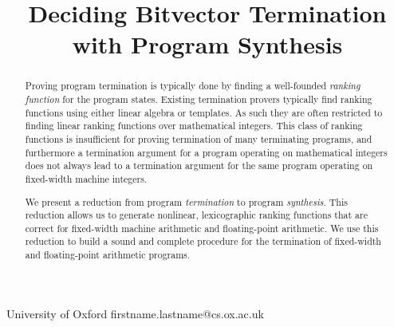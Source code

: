\documentclass[preprint]{sigplanconf}
\theoremstyle{definition}
\begin{document}
\setlength{\pdfpageheight}{\paperheight}
\setlength{\pdfpagewidth}{\paperwidth}





\title{Deciding Bitvector Termination with Program Synthesis}

           {University of Oxford}
           {firstname.lastname@cs.ox.ac.uk}

\maketitle

\begin{abstract}
%
Proving program termination is typically done by finding a well-founded
\emph{ranking function} for the program states.  Existing termination
provers typically find ranking functions using either linear algebra or
templates.  As such they are often restricted to finding linear ranking
functions over mathematical integers.  This class of ranking functions is
insufficient for proving termination of many terminating programs, and
furthermore a termination argument for a program operating on mathematical
integers does not always lead to a termination argument for the same program
operating on fixed-width machine integers.

We present a reduction from program \emph{termination} to program
\emph{synthesis}.  This reduction allows us to generate nonlinear,
lexicographic ranking functions that are correct for fixed-width machine
arithmetic and floating-point arithmetic.  We use this reduction to build a
sound and complete procedure for the termination of fixed-width and
floating-point arithmetic programs.
%
\end{abstract}

\end{document}
